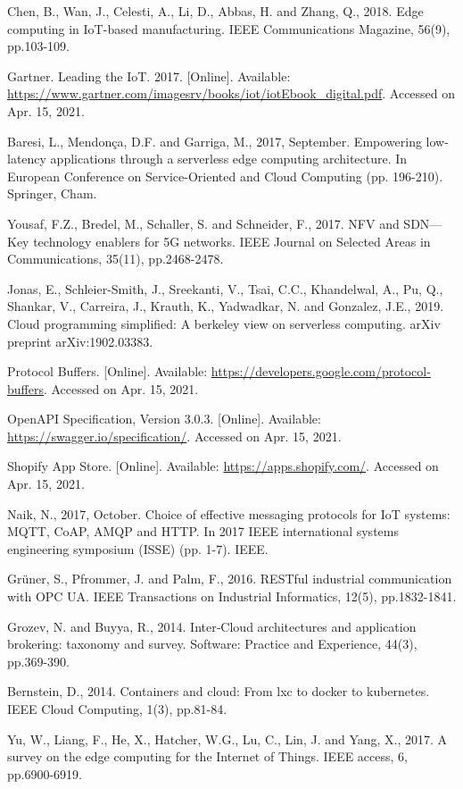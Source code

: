 \documentclass{ieeeaccess}
\begin{document}
\begin{thebibliography}{00}
 Chen, B., Wan, J., Celesti, A., Li, D., Abbas, H. and Zhang, Q., 2018. Edge computing in IoT-based manufacturing. IEEE Communications Magazine, 56(9), pp.103-109.

 Gartner. Leading the IoT. 2017. [Online]. Available: \url{https://www.gartner.com/imagesrv/books/iot/iotEbook_digital.pdf}. Accessed on Apr. 15, 2021.

 Baresi, L., Mendonça, D.F. and Garriga, M., 2017, September. Empowering low-latency applications through a serverless edge computing architecture. In European Conference on Service-Oriented and Cloud Computing (pp. 196-210). Springer, Cham.

 Yousaf, F.Z., Bredel, M., Schaller, S. and Schneider, F., 2017. NFV and SDN—Key technology enablers for 5G networks. IEEE Journal on Selected Areas in Communications, 35(11), pp.2468-2478.

 Jonas, E., Schleier-Smith, J., Sreekanti, V., Tsai, C.C., Khandelwal, A., Pu, Q., Shankar, V., Carreira, J., Krauth, K., Yadwadkar, N. and Gonzalez, J.E., 2019. Cloud programming simplified: A berkeley view on serverless computing. arXiv preprint arXiv:1902.03383.

 Protocol Buffers. [Online]. Available: \url{https://developers.google.com/protocol-buffers}. Accessed on Apr. 15, 2021.

 OpenAPI Specification, Version 3.0.3. [Online]. Available: \url{https://swagger.io/specification/}. Accessed on Apr. 15, 2021.

 Shopify App Store. [Online]. Available: \url{https://apps.shopify.com/}. Accessed on Apr. 15, 2021.

 Naik, N., 2017, October. Choice of effective messaging protocols for IoT systems: MQTT, CoAP, AMQP and HTTP. In 2017 IEEE international systems engineering symposium (ISSE) (pp. 1-7). IEEE.

 Grüner, S., Pfrommer, J. and Palm, F., 2016. RESTful industrial communication with OPC UA. IEEE Transactions on Industrial Informatics, 12(5), pp.1832-1841.

 Grozev, N. and Buyya, R., 2014. Inter‐Cloud architectures and application brokering: taxonomy and survey. Software: Practice and Experience, 44(3), pp.369-390.

 Bernstein, D., 2014. Containers and cloud: From lxc to docker to kubernetes. IEEE Cloud Computing, 1(3), pp.81-84.

 Yu, W., Liang, F., He, X., Hatcher, W.G., Lu, C., Lin, J. and Yang, X., 2017. A survey on the edge computing for the Internet of Things. IEEE access, 6, pp.6900-6919.

\end{thebibliography}

\EOD
\end{document}

